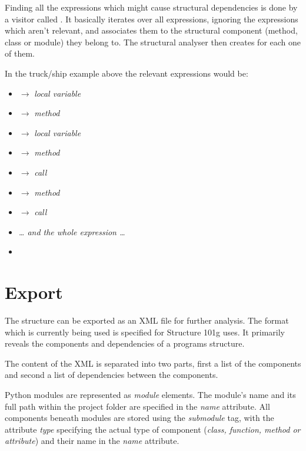 \documentclass[12pt,halfparskip,DIV11,BCOR10mm]{scrreprt}
\begin{document}
Finding all the expressions which might cause structural dependencies is done by a visitor called . It basically iterates over all expressions, ignoring the expressions which aren't relevant, and associates them to the structural component (method, class or module) they belong to. The structural analyser then creates  for each one of them. 

In the truck/ship example above the relevant expressions would be:

\begin{itemize}
    \item {} $\rightarrow$ \emph{local variable}
    \item {} $\rightarrow$ \emph{method}
    \item {} $\rightarrow$ \emph{local variable}
    \item {} $\rightarrow$ \emph{method}
    \item {} $\rightarrow$ \emph{call}
    \item {} $\rightarrow$ \emph{method}
    \item {} $\rightarrow$ \emph{call}
    \item[] \emph{… and the whole expression …}
    \item {} 
\end{itemize}

\section{Export}

The structure can be exported as an XML file for further analysis. The format which is currently being used is specified for Structure 101g uses. It primarily reveals the components and dependencies of a programs structure. 

The content of the XML is separated into two parts, first a list of the components and second a list of dependencies between the components.


Python modules are represented as \emph{module} elements. The module's name and its full path within the project folder are specified in the \emph{name} attribute. All components beneath modules are stored using the \emph{submodule} tag, with the attribute \emph{type} specifying the actual type of component (\emph{class, function, method or attribute}) and their name in the \emph{name} attribute.
\end{document}
